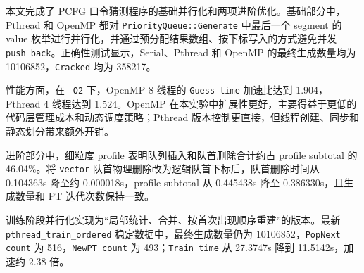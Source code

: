 \documentclass[UTF8,a4paper,12pt]{ctexart}
\begin{document}
本文完成了 PCFG 口令猜测程序的基础并行化和两项进阶优化。基础部分中，Pthread 和 OpenMP 都对 \texttt{PriorityQueue::Generate} 中最后一个 segment 的 value 枚举进行并行化，并通过预分配结果数组、按下标写入的方式避免并发 \texttt{push\_back}。正确性测试显示，Serial、Pthread 和 OpenMP 的最终生成数量均为 10106852，\texttt{Cracked} 均为 358217。

性能方面，在 \texttt{-O2} 下，OpenMP 8 线程的 \texttt{Guess time} 加速比达到 1.904，Pthread 4 线程达到 1.524。OpenMP 在本实验中扩展性更好，主要得益于更低的代码层管理成本和动态调度策略；Pthread 版本控制更直接，但线程创建、同步和静态划分带来额外开销。

进阶部分中，细粒度 profile 表明队列插入和队首删除合计约占 profile subtotal 的 46.04\%。将 \texttt{vector} 队首物理删除改为逻辑队首下标后，队首删除时间从 0.104363s 降至约 0.000018s，profile subtotal 从 0.445438s 降至 0.386330s，且生成数量和 PT 迭代次数保持一致。

训练阶段并行化实现为“局部统计、合并、按首次出现顺序重建”的版本。最新 \texttt{pthread\_train\_ordered} 稳定数据中，最终生成数量仍为 10106852，\texttt{PopNext count} 为 516，\texttt{NewPT count} 为 493；\texttt{Train time} 从 27.3747s 降到 11.5142s，加速约 2.38 倍。
\end{document}
